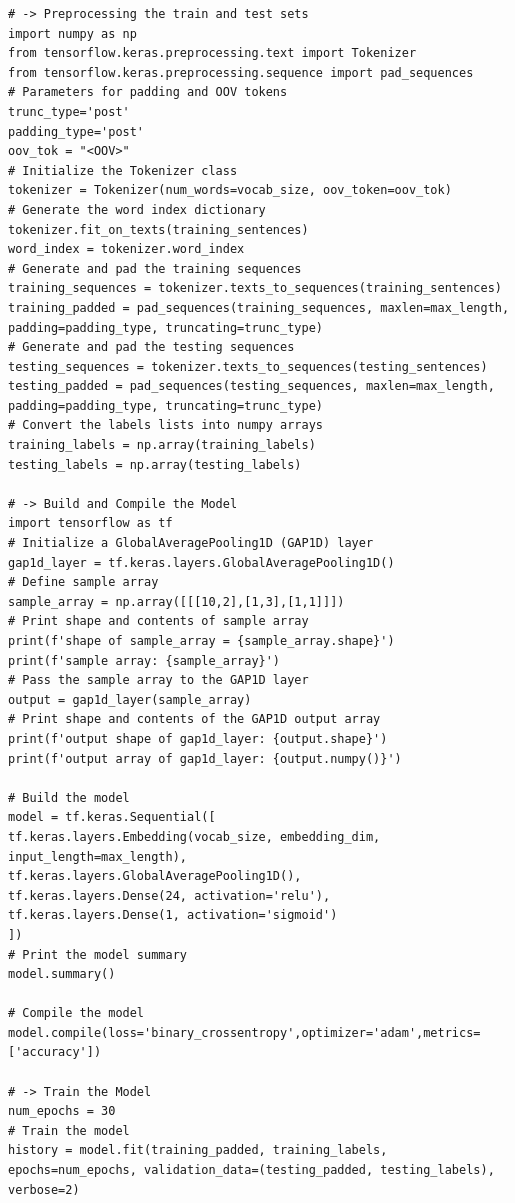 \documentclass[20pt]{article}
\begin{document}
\begin{itemize}
\begin{verbatim}
# -> Preprocessing the train and test sets
import numpy as np
from tensorflow.keras.preprocessing.text import Tokenizer
from tensorflow.keras.preprocessing.sequence import pad_sequences
# Parameters for padding and OOV tokens
trunc_type='post'
padding_type='post'
oov_tok = "<OOV>"
# Initialize the Tokenizer class
tokenizer = Tokenizer(num_words=vocab_size, oov_token=oov_tok)
# Generate the word index dictionary
tokenizer.fit_on_texts(training_sentences)
word_index = tokenizer.word_index
# Generate and pad the training sequences
training_sequences = tokenizer.texts_to_sequences(training_sentences)
training_padded = pad_sequences(training_sequences, maxlen=max_length, padding=padding_type, truncating=trunc_type)
# Generate and pad the testing sequences
testing_sequences = tokenizer.texts_to_sequences(testing_sentences)
testing_padded = pad_sequences(testing_sequences, maxlen=max_length, padding=padding_type, truncating=trunc_type)
# Convert the labels lists into numpy arrays
training_labels = np.array(training_labels)
testing_labels = np.array(testing_labels)

# -> Build and Compile the Model
import tensorflow as tf
# Initialize a GlobalAveragePooling1D (GAP1D) layer
gap1d_layer = tf.keras.layers.GlobalAveragePooling1D()
# Define sample array
sample_array = np.array([[[10,2],[1,3],[1,1]]])
# Print shape and contents of sample array
print(f'shape of sample_array = {sample_array.shape}')
print(f'sample array: {sample_array}')
# Pass the sample array to the GAP1D layer
output = gap1d_layer(sample_array)
# Print shape and contents of the GAP1D output array
print(f'output shape of gap1d_layer: {output.shape}')
print(f'output array of gap1d_layer: {output.numpy()}')

# Build the model
model = tf.keras.Sequential([
tf.keras.layers.Embedding(vocab_size, embedding_dim, input_length=max_length),
tf.keras.layers.GlobalAveragePooling1D(),
tf.keras.layers.Dense(24, activation='relu'),
tf.keras.layers.Dense(1, activation='sigmoid')
])
# Print the model summary
model.summary()

# Compile the model
model.compile(loss='binary_crossentropy',optimizer='adam',metrics=['accuracy'])

# -> Train the Model
num_epochs = 30
# Train the model
history = model.fit(training_padded, training_labels, epochs=num_epochs, validation_data=(testing_padded, testing_labels), verbose=2)


\end{verbatim}
\end{itemize}
\end{document}
